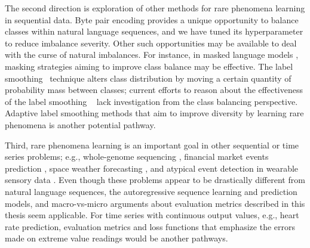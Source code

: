 The second direction is exploration of other methods for rare phenomena learning in sequential data.
Byte pair encoding provides a unique opportunity to balance classes within natural language sequences, and we have tuned its hyperparameter to reduce imbalance severity. 
Other such opportunities may be available to deal with the curse of natural imbalances.
For instance, in masked language models \cite{devlin-etal-2019-bert,rogers-etal-2020-primer}, masking strategies aiming to improve class balance may be effective. 
The label smoothing~\cite{szegedy2016re-inception} technique alters class distribution by moving a certain quantity of probability mass between classes; current efforts to reason about the effectiveness of the label smoothing ~\cite{muller-2019-when-labelsmooth,gao-etal-2020-towards} lack investigation from the class balancing perspective.
Adaptive label smoothing methods \cite{wang-etal-2021-diversifying} that aim to improve diversity by learning rare phenomena is another potential pathway.


Third, rare phenomena learning is an important goal in other sequential or time series problems; e.g., whole-genome sequencing \cite{schubach-2017-imbalance-genome}, financial market events prediction \cite{rechenthin-2014-ml-stock}, space weather forecasting \cite{azim-etal-2019-rare-solar-flare}, and atypical event detection in wearable sensory data \cite{burghardt2021having}. 
Even though these problems appear to be drastically different from natural language sequences, the autoregressive sequence learning and prediction models, and macro-vs-micro arguments about evaluation metrics described in this thesis seem applicable.
For time series with continuous output values, e.g., heart rate prediction, evaluation metrics and loss functions that emphasize the errors made on extreme value readings would be another pathways. 


